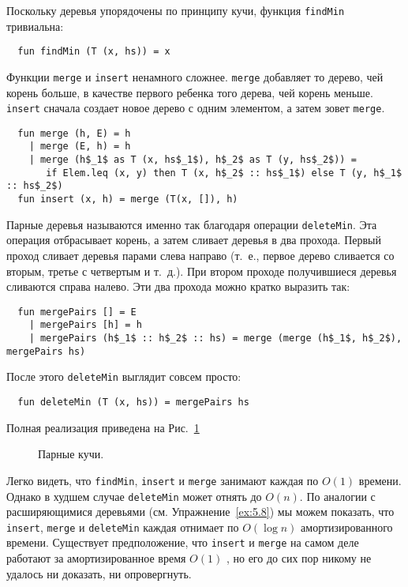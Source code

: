 Поскольку деревья упорядочены по принципу кучи, функция
\lstinline!findMin! тривиальна:
\begin{lstlisting}
  fun findMin (T (x, hs)) = x
\end{lstlisting}
Функции \lstinline!merge! и \lstinline!insert! ненамного
сложнее. \lstinline!merge! добавляет то дерево, чей корень больше, в
качестве первого ребенка того дерева, чей корень
меньше. \lstinline!insert! сначала создает новое дерево с одним
элементом, а затем зовет \lstinline!merge!.
\begin{lstlisting}
  fun merge (h, E) = h
    | merge (E, h) = h
    | merge (h$_1$ as T (x, hs$_1$), h$_2$ as T (y, hs$_2$)) =
       if Elem.leq (x, y) then T (x, h$_2$ :: hs$_1$) else T (y, h$_1$ :: hs$_2$)
  fun insert (x, h) = merge (T(x, []), h)
\end{lstlisting}
Парные деревья называются именно так благодаря операции
\lstinline!deleteMin!. Эта операция отбрасывает корень, а затем
сливает деревья в два прохода. Первый проход сливает деревья парами
слева направо (т.~е., первое дерево сливается со вторым, третье с
четвертым и т.~д.). При втором проходе получившиеся деревья сливаются
справа налево. Эти два прохода можно кратко выразить так:
\begin{lstlisting}
  fun mergePairs [] = E
    | mergePairs [h] = h
    | mergePairs (h$_1$ :: h$_2$ :: hs) = merge (merge (h$_1$, h$_2$), mergePairs hs)
\end{lstlisting}
После этого \lstinline!deleteMin! выглядит совсем просто:
\begin{lstlisting}
  fun deleteMin (T (x, hs)) = mergePairs hs
\end{lstlisting}
Полная реализация приведена на Рис.~\ref{fig:5.6}

\begin{figure}
  \centering
  
  \caption{Парные кучи.}
  \label{fig:5.6}
\end{figure}

Легко видеть, что \lstinline!findMin!, \lstinline!insert! и
\lstinline!merge! занимают каждая по $O(1)$ времени. Однако в худшем
случае \lstinline!deleteMin! может отнять до $O(n)$. По аналогии с
расширяющимися деревьями (см. Упражнение~\ref{ex:5.8}) мы можем
показать, что \lstinline!insert!, \lstinline!merge! и
\lstinline!deleteMin! каждая отнимает по $O(\log n)$ амортизированного
времени. Существует предположение, что \lstinline!insert! и
\lstinline!merge! на самом деле работают за амортизированное время
$O(1)$ \cite{Fredman-etal1986}, но его до сих пор никому не удалось ни
доказать, ни опровергнуть.

